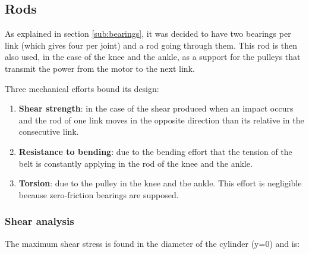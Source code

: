 \subsection{Rods} %
\label{sub:rods}
As explained in section \ref{sub:bearings}, it was decided to have two bearings per link (which gives four per joint) and a rod going through them.
This rod is then also used, in the case of the knee and the ankle, as a support for the pulleys that transmit the power from the motor to the next link.

Three mechanical efforts bound its design:
\begin{enumerate}
  \item \textbf{Shear strength}: in the case of the shear produced when an impact occurs and the rod of one link moves in the opposite direction than its relative in the consecutive link.
  \item \textbf{Resistance to bending}: due to the bending effort that the tension of the belt is constantly applying in the rod of the  knee and the ankle.
  \item \textbf{Torsion}: due to the pulley in the knee and the ankle. 
  This effort is negligible because zero-friction bearings are supposed.
\end{enumerate}

  \subsubsection{Shear analysis} %
  \label{ssub:shear_analysis}
  The maximum shear stress is found in the diameter of the cylinder (y=0) and is:
  
